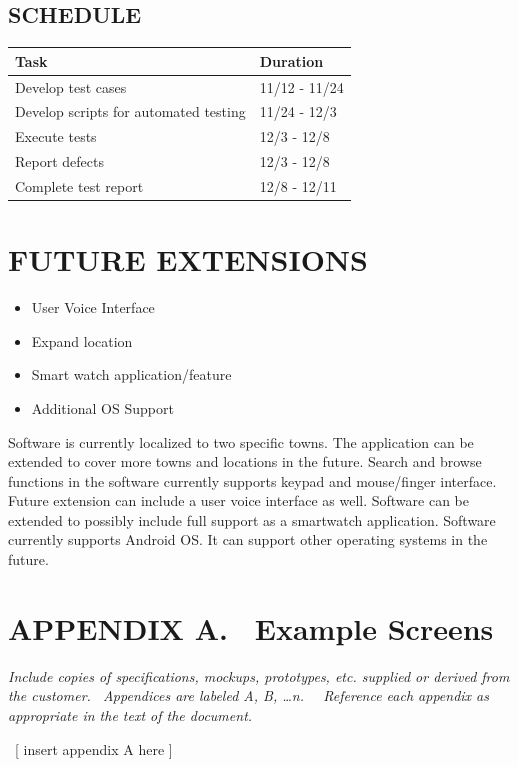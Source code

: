 \documentclass[twoside,letterpaper]{article}
\begin{document}
\subsection{SCHEDULE}
{\rmfamily\color{black}
\begin{center}
\begin{tabular}{ | M{5cm} | M{5cm}| } 
\hline
\textbf{Task} & \textbf{Duration}\\ 
\hline
Develop test cases & 11/12 - 11/24 \\ 
\hline
Develop scripts for automated testing & 11/24 - 12/3 \\ 
\hline
Execute tests & 12/3 - 12/8 \\ 
\hline
Report defects & 12/3 - 12/8 \\ 
\hline
Complete test report & 12/8 - 12/11 \\ 
\hline
\end{tabular}
\end{center}
}

\clearpage\section{FUTURE EXTENSIONS}
\begin{itemize}
\item{User Voice Interface}
\item{Expand location}
\item{Smart watch application/feature}
\item{Additional OS Support}
\end{itemize}
{\rmfamily\color{black}
Software is currently localized to two specific towns.  The application can be extended to cover more towns and locations in the future.
Search and browse functions in the software currently supports keypad and mouse/finger interface.  Future extension can include a user voice interface as well. 
Software can be extended to possibly include full support as a smartwatch application. 
Software currently supports Android OS.  It can support other operating systems in the future.}

\clearpage\section[APPENDIX A. \ Example Screens]{\rmfamily\bfseries\color{black}
APPENDIX A. \ Example Screens}

\bigskip

{\itshape\color{black}
Include copies of specifications, mockups, prototypes, etc. supplied or
derived from the customer. \ Appendices are labeled A, B, {\dots}n.
\ \ Reference each appendix as appropriate in the text of the document.
}

{\color{black}
\foreignlanguage{english}{\ }\foreignlanguage{english}{[ insert appendix
A here ]}}

\bigskip
\end{document}
